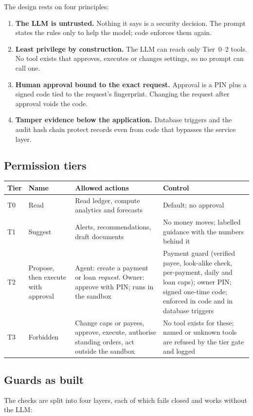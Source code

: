 \documentclass[10pt,a4paper]{article}
\begin{document}
The design rests on four principles:
\begin{enumerate}
  \item \textbf{The LLM is untrusted.} Nothing it says is a security decision. The prompt states the rules only to help the model; code enforces them again.
  \item \textbf{Least privilege by construction.} The LLM can reach only Tier~0--2 tools. No tool exists that approves, executes or changes settings, so no prompt can call one.
  \item \textbf{Human approval bound to the exact request.} Approval is a PIN plus a signed code tied to the request's fingerprint. Changing the request after approval voids the code.
  \item \textbf{Tamper evidence below the application.} Database triggers and the audit hash chain protect records even from code that bypasses the service layer.
\end{enumerate}

\subsection{Permission tiers}
\label{sec:tiers}
\begin{center}
\begin{tabularx}{\textwidth}{@{}p{1cm}p{3.1cm}p{5cm}Y@{}}
\toprule
\textbf{Tier} & \textbf{Name} & \textbf{Allowed actions} & \textbf{Control}\\
\midrule
T0 & Read & Read ledger, compute analytics and forecasts & Default; no approval\\
T1 & Suggest & Alerts, recommendations, draft documents & No money moves; labelled guidance with the numbers behind it\\
T2 & Propose, then execute with approval & Agent: create a payment or loan \emph{request}. Owner: approve with PIN; runs in the sandbox & Payment guard (verified payee, look-alike check, per-payment, daily and loan caps); owner PIN; signed one-time code; enforced in code and in database triggers\\
T3 & Forbidden & Change caps or payees, approve, execute, authorise standing orders, act outside the sandbox & No tool exists for these; named or unknown tools are refused by the tier gate and logged\\
\bottomrule
\end{tabularx}
\end{center}

\subsection{Guards as built}
The checks are split into four layers, each of which fails closed and works without the LLM:
\end{document}
